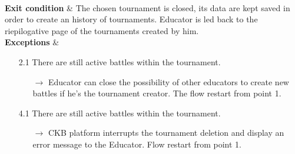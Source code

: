 \documentclass{article}
\begin{document}
{\begin{enumerate}
\begin{xltabular}{\textwidth}
\begin{enumerate}
                                                    \end{enumerate} \\
                        \hline
                        \textbf{Exit condition} & The chosen tournament is closed, its data are kept saved in
                        order to create an history of tournaments. Educator is led back to the riepilogative 
                        page of the tournaments created by him. \\
                        \hline
                        \textbf{Exceptions} &    \begin{itemize}
                                                    \item[2.1] There are still active battles within the tournament. 
                                                    \begin{itemize}
                                                        \item[$\rightarrow$] Educator can close the possibility of 
                                                        other educators to create new battles if he's the tournament
                                                        creator. The flow restart from point 1.
                                                    \end{itemize} 
                                                    \item[4.1] There are still active battles within the tournament.
                                                    \begin{itemize}
                                                        \item[$\rightarrow$] CKB platform interrupts the tournament
                                                        deletion and display an error message to the Educator. Flow
                                                        restart from point 1.
                                                    \end{itemize} 
                                                \end{itemize}
                    \end{xltabular}
                    


\end{enumerate}}
\end{document}

